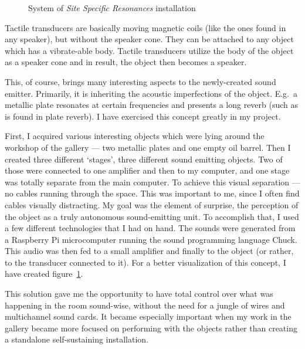 \documentclass[12pt,a4paper,oneside]{report}
\begin{document}
\begin{figure}
        \caption{System of \emph{Site Specific Resonances} installation}
        \label{fig:sitespec}
\end{figure}


Tactile transducers are basically moving magnetic coils (like the ones found in any speaker), but without the speaker cone. They can be attached to any object which has a vibrate-able body. Tactile transducers utilize the body of the object as a speaker cone and in result, the object then becomes a speaker. 

This, of course, brings many interesting aspects to the newly-created sound emitter. Primarily, it is inheriting the acoustic imperfections of the object. E.g.\ a metallic plate resonates at certain frequencies and presents a long reverb (such as is found in plate reverb). I have exercised this concept greatly in my project.

First, I acquired various interesting objects which were lying around the workshop of the gallery --- two metallic plates and one empty oil barrel. Then I created three different `stages', three different sound emitting objects. Two of those were connected to one amplifier and then to my computer, and one stage was totally separate from the main computer. To achieve this visual separation --- no cables running through the space. This was important to me, since I often find cables visually distracting. My goal was the element of surprise, the perception of the object as a truly autonomous sound-emitting unit. To accomplish that, I used a few different technologies that I had on hand. The sounds were generated from a Raspberry Pi microcomputer running the sound programming language Chuck. This audio was then fed to a small amplifier and finally to the object (or rather, to the transducer connected to it). For a better visualization of this concept, I have created figure~\ref{fig:sitespec}.

This solution gave me the opportunity to have total control over what was happening in the room sound-wise, without the need for a jungle of wires and multichannel sound cards. It became especially important when my work in the gallery became more focused on performing with the objects rather than creating a standalone self-sustaining installation.
\end{document}
